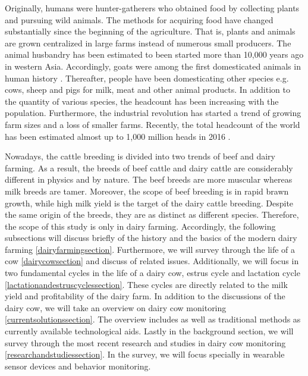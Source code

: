 \documentclass[english,12pt,a4paper,pdftex,elec,utf8]{aaltothesis}
\begin{document}
Originally, humans were hunter-gatherers who obtained food by collecting plants and pursuing wild animals. The methods for acquiring food have changed substantially since the beginning of the agriculture. That is, plants and animals are grown centralized in large farms instead of numerous small producers. The animal husbandry has been estimated to been started more than 10,000 years ago in western Asia. Accordingly, goats were among the first domesticated animals in human history \cite{ancienthistoryofmilk}. Thereafter, people have been domesticating other species e.g. cows, sheep and pigs for milk, meat and other animal products. In addition to the quantity of various species, the headcount has been increasing with the population. Furthermore, the industrial revolution has started a trend of growing farm sizes and a loss of smaller farms. Recently, the total headcount of the world has been estimated almost up to 1,000 million heads in 2016 \cite{livestockandpoultry}.

Nowadays, the cattle breeding is divided into two trends of beef and dairy farming. As a result, the breeds of beef cattle and dairy cattle are considerably different in physics and by nature. The beef breeds are more muscular whereas milk breeds are tamer. Moreover, the scope of beef breeding is in rapid brawn growth, while high milk yield is the target of the dairy cattle breeding. Despite the same origin of the breeds, they are as distinct as different species. Therefore, the scope of this study is only in dairy farming. Accordingly, the following subsections will discuss briefly of the history and the basics of the modern dairy farming \ref{dairyfarmingsection}. Furthermore, we will survey through the life of a cow \ref{dairycowsection} and discuss of related issues. Additionally, we will focus in two fundamental cycles in the life of a dairy cow, estrus cycle and lactation cycle \ref{lactationandestruscyclessection}. These cycles are directly related to the milk yield and profitability of the dairy farm. In addition to the discussions of the dairy cow, we will take an overview on dairy cow monitoring \ref{currentsolutionssection}. The overview includes as well as traditional methods as currently available technological aids. Lastly in the background section, we will survey through the most recent research and studies in dairy cow monitoring \ref{researchandstudiessection}. In the survey, we will focus specially in wearable sensor devices and behavior monitoring.

\end{document}
